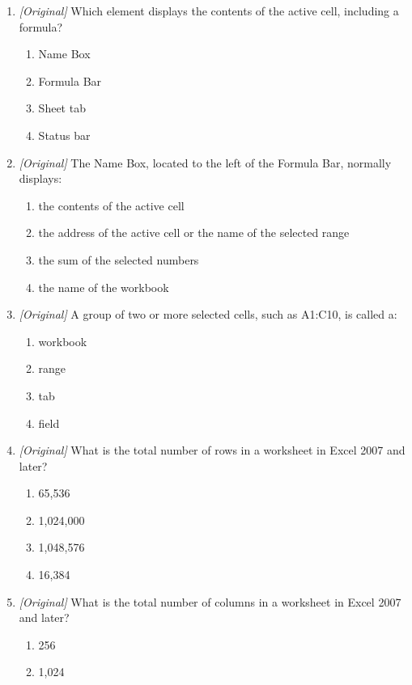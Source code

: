 \begin{enumerate}[label=\textbf{Q\arabic*.}, leftmargin=*]
\begin{enumerate}[label=\Alph*.]
    \item formula cell
  \end{enumerate}
\item \textit{[Original]} Which element displays the contents of the active
  cell, including a formula?
  \begin{enumerate}[label=\Alph*.]
    \item Name Box
    \item Formula Bar
    \item Sheet tab
    \item Status bar
  \end{enumerate}
\item \textit{[Original]} The Name Box, located to the left of the Formula
  Bar, normally displays:
  \begin{enumerate}[label=\Alph*.]
    \item the contents of the active cell
    \item the address of the active cell or the name of the selected range
    \item the sum of the selected numbers
    \item the name of the workbook
  \end{enumerate}
\item \textit{[Original]} A group of two or more selected cells, such as
  A1:C10, is called a:
  \begin{enumerate}[label=\Alph*.]
    \item workbook
    \item range
    \item tab
    \item field
  \end{enumerate}
\item \textit{[Original]} What is the total number of rows in a worksheet in
  Excel 2007 and later?
  \begin{enumerate}[label=\Alph*.]
    \item 65,536
    \item 1,024,000
    \item 1,048,576
    \item 16,384
  \end{enumerate}
\item \textit{[Original]} What is the total number of columns in a worksheet
  in Excel 2007 and later?
  \begin{enumerate}[label=\Alph*.]
    \item 256
    \item 1,024

\end{enumerate}
\end{enumerate}

